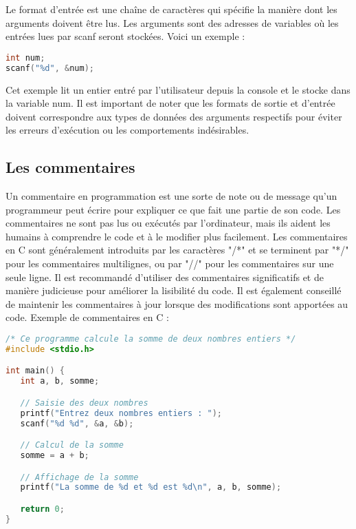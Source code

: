 \documentclass{uofa-eng-assignment}
\begin{document}
\noindent \newline
Le format d'entrée est une chaîne de caractères qui spécifie la manière dont les arguments doivent être lus. Les arguments sont des adresses de variables où les entrées lues par scanf seront stockées.
\newline \newline
Voici un exemple :
\begin{lstlisting}[language=c]
int num;
scanf("%d", &num);
\end{lstlisting}
\noindent \newline
Cet exemple lit un entier entré par l'utilisateur depuis la console et le stocke dans la variable num.
\newline \newline
Il est important de noter que les formats de sortie et d'entrée doivent correspondre aux types de données des arguments respectifs pour éviter les erreurs d'exécution ou les comportements indésirables.

\subsection{Les commentaires}
Un commentaire en programmation est une sorte de note ou de message qu'un programmeur peut écrire pour expliquer ce que fait une partie de son code. Les commentaires ne sont pas lus ou exécutés par l'ordinateur, mais ils aident les humains à comprendre le code et à le modifier plus facilement.
\newline \newline
Les commentaires en C sont généralement introduits par les caractères "/*" et se terminent par "*/" pour les commentaires multilignes, ou par "//" pour les commentaires sur une seule ligne. Il est recommandé d'utiliser des commentaires significatifs et de manière judicieuse pour améliorer la lisibilité du code. Il est également conseillé de maintenir les commentaires à jour lorsque des modifications sont apportées au code.
\newline \newline
Exemple de commentaires en C :

\begin{lstlisting}[language=c]
/* Ce programme calcule la somme de deux nombres entiers */
#include <stdio.h>

int main() {
   int a, b, somme;

   // Saisie des deux nombres
   printf("Entrez deux nombres entiers : ");
   scanf("%d %d", &a, &b);

   // Calcul de la somme
   somme = a + b;

   // Affichage de la somme
   printf("La somme de %d et %d est %d\n", a, b, somme);

   return 0;
}
\end{lstlisting}
\end{document}
